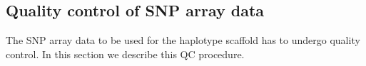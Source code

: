 \subsection{Quality control of SNP array data}
The SNP array data to be used for the haplotype scaffold has to undergo quality control. In this section we describe this QC procedure.